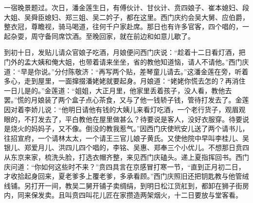 一宿晚景题过。次日，潘金莲生日，有傅伙计、甘伙计、贲四娘子、崔本媳妇、段大姐、吴舜臣媳妇、郑三姐、吴二妗子，都在这里。西门庆约会吴大舅、应伯爵，整衣冠，尊瞻视，骑马喝道，往何千户家赴席。那日也有许多官客，四个唱的，一起杂耍，周守备同席饮酒。至晚回家，就在前边和如意儿歇了。

到初十日，发贴儿请众官娘子吃酒，月娘便问西门庆说：“趁着十二日看灯酒，把门外的孟大姨和俺大姐，也带着请来坐坐，省的教他知道恼，请人不请他。”西门庆道：“早是你说。”分付陈敬济：“再写两个贴，差琴童儿请去。”这潘金莲在旁，听着多心，走到屋里，一面撺掇潘姥姥就要起身。月娘道：“姥姥你慌去怎的？再消住一日儿是的。”金莲道：“姐姐，大正月里，他家里丢着孩子，没人看，教他去罢。”慌的月娘装了两个盒子点心茶食，又与了他一钱轿子钱，管待打发去了。金莲因对着李娇儿说：“他明日请他有钱的大姨儿来看灯吃酒，一个老行货子，观眉观眼的，不打发去了，平白教他在屋里做甚么？待要说是客人，没好衣服穿。待要说是烧火的妈妈子，又不像。倒没的教我惹气。”因西门庆使玳安儿送了两个请书儿，往招宣府，一个请林太太，一个请王三官儿娘子黄氏。又使他院中早叫李桂儿、吴银儿、郑爱月儿、洪四儿四个唱的，李铭、吴惠、郑奉三个小优儿。不想那日贲四从东京来家，梳洗头脸，打选衣帽齐整，来见西门庆磕头。递上夏指挥回书。西门庆问道：“你如何这些时不来？”贲四具言在京感冒打寒一节，“直到正月初二日，才收拾起身回来，夏老爹多上覆老爹，多承看顾。”西门庆照旧还把钥匙教与他管绒线铺。另打开一间，教吴二舅开铺子卖绸绢，到明日松江货舡到，都卸在狮子街房内，同来保发卖。且叫贲四叫花儿匠在家攒造两架烟火，十二日要放与堂客看。

